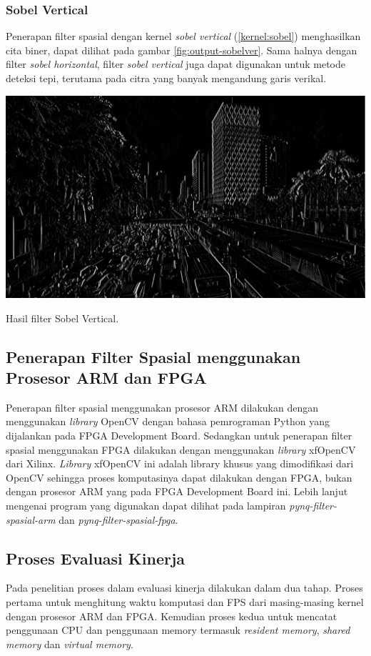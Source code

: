 \subsubsection{Sobel Vertical}
Penerapan filter spasial dengan kernel \textit{sobel vertical} (\ref{kernel:sobel}) menghasilkan cita biner, dapat dilihat pada gambar \ref{fig:output-sobelver}. Sama halnya dengan filter \textit{sobel horizontal}, filter \textit{sobel vertical} juga dapat digunakan untuk metode deteksi tepi, terutama pada citra yang banyak mengandung garis verikal.
\begin{afigure}
    \includegraphics[width=0.8\linewidth, center]{images/output-image/input1-sobelver.png}
    \caption{Hasil filter Sobel Vertical.}
    \label{fig:output-sobelver}
\end{afigure}

\subsection{Penerapan Filter Spasial menggunakan Prosesor ARM dan FPGA}
Penerapan filter spasial menggunakan prosesor ARM dilakukan dengan menggunakan \textit{library} OpenCV dengan bahasa pemrograman Python yang dijalankan pada FPGA Development Board. Sedangkan untuk penerapan filter spasial menggunakan FPGA dilakukan dengan menggunakan \textit{library} xfOpenCV dari Xilinx. \textit{Library} xfOpenCV ini adalah library khusus yang dimodifikasi dari OpenCV sehingga proses komputasinya dapat dilakukan dengan FPGA, bukan dengan prosesor ARM yang pada FPGA Development Board ini. Lebih lanjut mengenai program yang digunakan dapat dilihat pada lampiran \textit{pynq-filter-spasial-arm} dan \textit{pynq-filter-spasial-fpga}.

\subsection{Proses Evaluasi Kinerja}
Pada penelitian proses dalam evaluasi kinerja dilakukan dalam dua tahap. Proses pertama untuk menghitung waktu komputasi dan FPS dari masing-masing kernel dengan prosesor ARM dan FPGA. Kemudian proses kedua untuk mencatat penggunaan CPU dan penggunaan memory termasuk \textit{resident memory}, \textit{shared memory} dan \textit{virtual memory}. 

